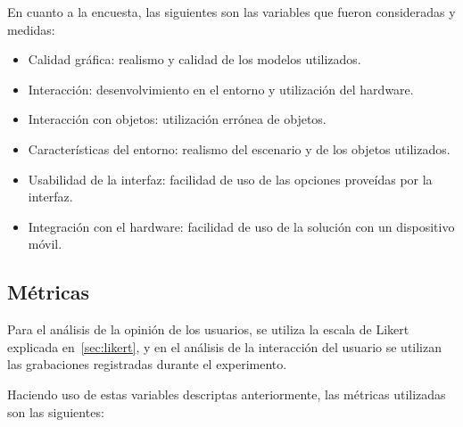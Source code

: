 En cuanto a la encuesta, las siguientes son las variables que fueron consideradas y medidas:

\begin{itemize}

\item Calidad gráfica: realismo y calidad de los modelos utilizados.

\item Interacción: desenvolvimiento en el entorno y utilización del hardware.

\item Interacción con objetos: utilización errónea de objetos.

\item Características del entorno: realismo del escenario y de los objetos
    utilizados.

\item Usabilidad de la interfaz: facilidad de uso de las opciones proveídas por
    la interfaz.

\item Integración con el hardware: facilidad de uso de la solución con un dispositivo móvil. 

\end{itemize}

\subsection{Métricas}

Para el análisis de la opinión de los usuarios, se utiliza la escala de Likert
explicada en~\ref{sec:likert}, y en el análisis de la interacción del usuario se
utilizan las grabaciones registradas durante el experimento.

Haciendo uso de estas variables descriptas anteriormente, las métricas
utilizadas son las siguientes:

